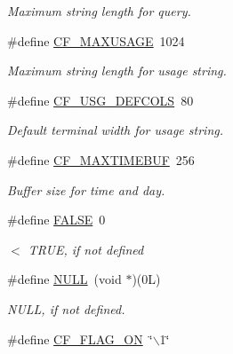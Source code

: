 \begin{DoxyCompactItemize}
\begin{DoxyCompactList}\small\item\em Maximum string length for query. \end{DoxyCompactList}\item 
\hypertarget{group__cflib__core_gad36d92b5077988734cdfeb0f47c0488e}{\#define \hyperlink{group__cflib__core_gad36d92b5077988734cdfeb0f47c0488e}{C\-F\-\_\-\-M\-A\-X\-U\-S\-A\-G\-E}~1024}\label{group__cflib__core_gad36d92b5077988734cdfeb0f47c0488e}

\begin{DoxyCompactList}\small\item\em Maximum string length for usage string. \end{DoxyCompactList}\item 
\hypertarget{group__cflib__core_gac568df32f08baaff9c162521856c3ec7}{\#define \hyperlink{group__cflib__core_gac568df32f08baaff9c162521856c3ec7}{C\-F\-\_\-\-U\-S\-G\-\_\-\-D\-E\-F\-C\-O\-L\-S}~80}\label{group__cflib__core_gac568df32f08baaff9c162521856c3ec7}

\begin{DoxyCompactList}\small\item\em Default terminal width for usage string. \end{DoxyCompactList}\item 
\hypertarget{group__cflib__core_ga582af337c870e7eb2cdb133fd5cc72d2}{\#define \hyperlink{group__cflib__core_ga582af337c870e7eb2cdb133fd5cc72d2}{C\-F\-\_\-\-M\-A\-X\-T\-I\-M\-E\-B\-U\-F}~256}\label{group__cflib__core_ga582af337c870e7eb2cdb133fd5cc72d2}

\begin{DoxyCompactList}\small\item\em Buffer size for time and day. \end{DoxyCompactList}\item 
\#define \hyperlink{group__cflib__core_gaa93f0eb578d23995850d61f7d61c55c1}{F\-A\-L\-S\-E}~0
\begin{DoxyCompactList}\small\item\em $<$ T\-R\-U\-E, if not defined \end{DoxyCompactList}\item 
\hypertarget{group__cflib__core_ga070d2ce7b6bb7e5c05602aa8c308d0c4}{\#define \hyperlink{group__cflib__core_ga070d2ce7b6bb7e5c05602aa8c308d0c4}{N\-U\-L\-L}~(void $\ast$)(0\-L)}\label{group__cflib__core_ga070d2ce7b6bb7e5c05602aa8c308d0c4}

\begin{DoxyCompactList}\small\item\em N\-U\-L\-L, if not defined. \end{DoxyCompactList}\item 
\hypertarget{group__cflib__core_ga355c714f2912ac336b8b03468c978d8c}{\#define \hyperlink{group__cflib__core_ga355c714f2912ac336b8b03468c978d8c}{C\-F\-\_\-\-F\-L\-A\-G\-\_\-\-O\-N}~\char`\"{}$\backslash$1\char`\"{}}\label{group__cflib__core_ga355c714f2912ac336b8b03468c978d8c}


\end{DoxyCompactItemize}
